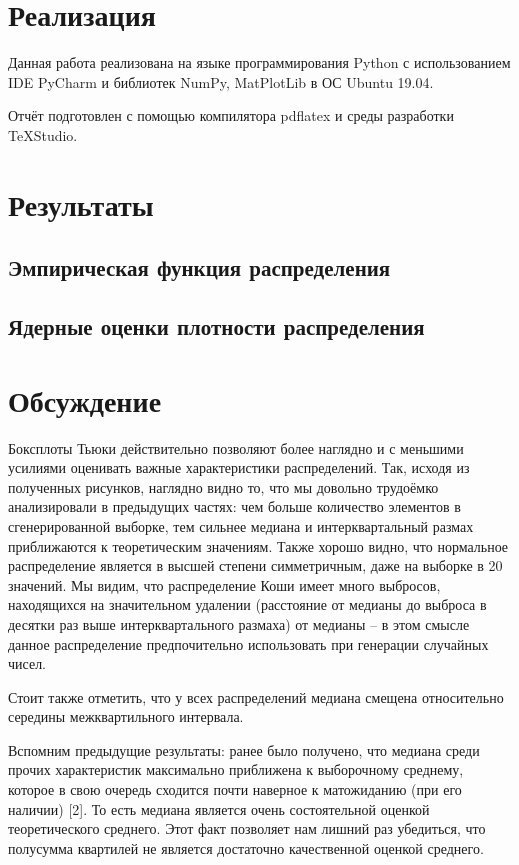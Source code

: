 \section{Реализация}
Данная работа реализована на языке программирования Python с использованием IDE PyCharm и библиотек NumPy, MatPlotLib в ОС Ubuntu 19.04.

Отчёт подготовлен с помощью компилятора pdflatex и среды разработки TeXStudio.

\section{Результаты}
\subsection{Эмпирическая функция распределения}


\subsection{Ядерные оценки плотности распределения}


\section{Обсуждение}

Боксплоты Тьюки действительно позволяют более наглядно и с меньшими усилиями оценивать важные характеристики распределений. Так, исходя из полученных рисунков, наглядно видно то, что мы довольно трудоёмко анализировали в предыдущих частях: чем больше количество элементов в сгенерированной выборке, тем сильнее медиана и интерквартальный размах приближаются к теоретическим значениям. Также хорошо видно, что нормальное распределение является в высшей степени симметричным, даже на выборке в 20 значений. Мы видим, что распределение Коши имеет много выбросов, находящихся на значительном удалении (расстояние от медианы до выброса в десятки раз выше интерквартального размаха) от медианы -- в этом смысле данное распределение предпочительно использовать при генерации случайных чисел.

Стоит также отметить, что у всех распределений медиана смещена относительно середины межквартильного интервала. 

Вспомним предыдущие результаты: ранее было получено, что медиана среди прочих характеристик максимально приближена к выборочному среднему, которое в свою очередь сходится почти наверное к матожиданию (при его наличии) [2]. То есть медиана является очень состоятельной оценкой теоретического среднего. Этот факт позволяет нам лишний раз убедиться, что полусумма квартилей не является достаточно качественной оценкой среднего.

